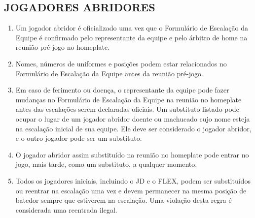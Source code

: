 \subsection{JOGADORES ABRIDORES}
\begin{enumerate}[label=(\alph*)]\item   Um jogador abridor é oficializado uma vez que o Formulário de Escalação da
 Equipe é confirmado pelo representante da equipe e pelo árbitro de \gls{home} na
 reunião pré-jogo no \gls{homeplate}.
\item  Nomes, números de uniformes e posições podem estar relacionados no Formulário de Escalação da Equipe antes da reunião pré-jogo.
\item  Em caso de ferimento ou doença, o representante da equipe pode fazer  mudanças no Formulário de Escalação da Equipe na reunião no \gls{homeplate}  antes das escalações serem declaradas oficiais. Um substituto listado pode  ocupar o lugar de um jogador abridor doente ou machucado cujo nome esteja na escalação inicial de sua equipe. Ele deve ser considerado o jogador abridor, e o outro jogador pode ser um substituto.
\item  O jogador abridor assim substituído na reunião no \gls{homeplate} pode entrar no jogo, mais tarde, como um substituto, a qualquer momento.
\item  Todos os jogadores iniciais, incluindo o JD e o FLEX, podem ser substituídos  ou reentrar na escalação uma vez e devem permanecer na mesma posição de  batedor sempre que estiverem na escalação. Uma violação desta regra é  considerada uma reentrada ilegal.
\end{enumerate}
